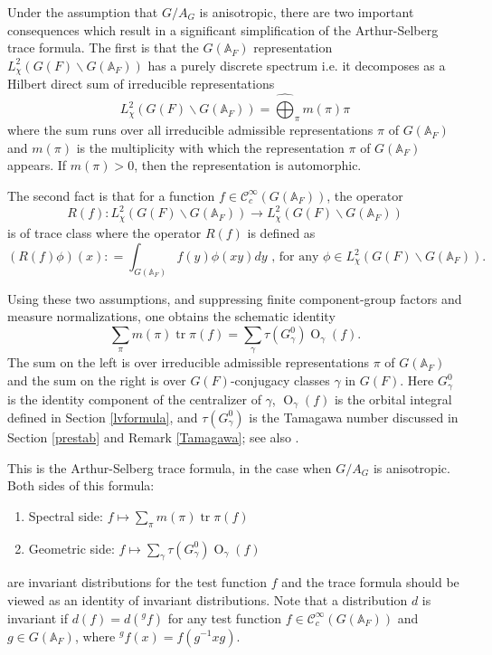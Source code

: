 \documentclass[11pt,a4paper]{article}
\theoremstyle{definition}
\theoremstyle{plain}
\theoremstyle{remark}
\theoremstyle{plain}
\DeclareMathOperator{\tr}{tr}
\DeclareMathOperator{\Or}{O}
\begin{document}
Under the assumption that $G/ A_G$ is anisotropic, there are two important consequences which result in a significant simplification of the Arthur-Selberg trace formula. The first is that the $G(\mathbb{A}_F)$ representation $L^2_{\chi}(G(F) \backslash G(\mathbb{A}_F))$ has a purely discrete spectrum i.e. it decomposes as a Hilbert direct sum of irreducible representations
$$ L^2_{\chi}(G(F) \backslash G(\mathbb{A}_F)) = \widehat{\bigoplus}_{\pi} m(\pi) \pi$$
where the sum runs over all irreducible admissible representations $\pi$ of $G(\mathbb{A}_F)$ and $m(\pi)$ is the multiplicity with which the representation $\pi$ of $G(\mathbb{A}_F)$ appears. If $m(\pi) > 0$, then the representation is automorphic.

The second fact is that for a function $f \in \mathcal{C}^{\infty}_c(G(\mathbb{A}_F))$, the operator $$R(f): L^2_{\chi}(G(F) \backslash G(\mathbb{A}_F)) \xrightarrow[]{} L^2_{\chi}(G(F) \backslash G(\mathbb{A}_F))$$ is of trace class where the operator $R(f)$ is defined as $$(R(f)\phi)(x) : = \int_{G(\mathbb{A}_F)} f(y) \phi(xy)dy \text{ , for any } \phi \in L^2_{\chi}(G(F) \backslash G(\mathbb{A}_F)). $$

Using these two assumptions, and suppressing finite component-group factors and measure normalizations, one obtains the schematic identity
$$ \sum_{\pi}  m(\pi) \tr \pi (f) = \sum_{\gamma} \tau (G_{\gamma}^0) \Or_{\gamma}(f).$$
The sum on the left is over irreducible admissible representations $\pi$ of $G(\mathbb{A}_F)$ and the sum on the right is over $G(F)$-conjugacy classes $\gamma$ in $G(F)$. Here $G_{\gamma}^0$ is the identity component of the centralizer of $\gamma$, $\Or_{\gamma}(f)$ is the orbital integral defined in Section \ref{lvformula}, and $\tau(G_{\gamma}^0)$ is the Tamagawa number discussed in Section \ref{prestab} and Remark \ref{Tamagawa}; see also \cite[\S\S 3.5, 5.3]{MR4615820}.

This is the Arthur-Selberg trace formula, in the case when $G/ A_G$ is anisotropic. Both sides of this formula:
\begin{enumerate}
    \item Spectral side: $f \mapsto \sum_{\pi} m(\pi) \tr \pi (f)$
    \item Geometric side: $f \mapsto \sum_{\gamma} \tau(G_{\gamma}^0)\Or_{\gamma}(f)$ 
\end{enumerate}
are invariant distributions for the test function $f$ and the trace formula should be viewed as an identity of invariant distributions. Note that a distribution $d$ is invariant if $d(f) = d (^g f)$ for any test function $f \in \mathcal{C}^{\infty}_c(G(\mathbb{A}_F))$ and $g \in G(\mathbb{A}_F)$, where $^g f(x) = f( g^{-1} x g)$.
\end{document}
